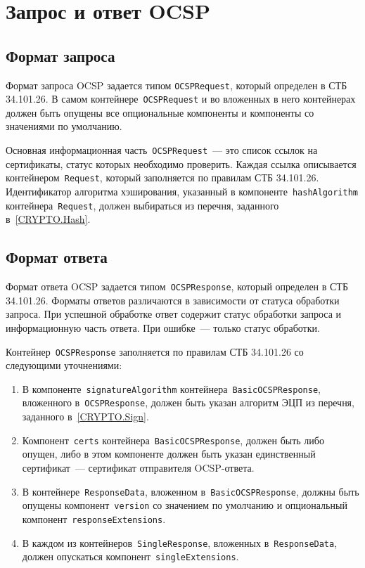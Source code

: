 \section{Запрос и ответ OCSP}\label{FMT.OCSP}

\subsection{Формат запроса}

Формат запроса OCSP задается типом \texttt{OCSPRequest}, который определен 
в СТБ 34.101.26. В самом контейнере~\texttt{OCSPRequest} и во вложенных в него
контейнерах должен быть опущены все опциональные компоненты и компоненты 
со значениями по умолчанию.

Основная информационная часть~\texttt{OCSPRequest}~--- это список ссылок
на сертификаты, статус которых необходимо проверить.
%
Каждая ссылка описывается контейнером~\texttt{Request}, который заполняется
по правилам СТБ 34.101.26. Идентификатор алгоритма хэширования, указанный в
компоненте~\texttt{hashAlgorithm} контейнера~\texttt{Request}, должен
выбираться из перечня, заданного в~\ref{CRYPTO.Hash}.

\subsection{Формат ответа}

Формат ответа OCSP задается типом~\texttt{OCSPResponse}, который определен 
в СТБ 34.101.26. Форматы ответов различаются в зависимости от статуса 
обработки запроса. При успешной обработке ответ содержит статус обработки 
запроса и информационную часть ответа. При ошибке~--- только статус обработки.

Контейнер~\texttt{OCSPResponse} заполняется по правилам СТБ 34.101.26
со следующими уточнениями:

\begin{enumerate}
\item
В компоненте~\texttt{signatureAlgorithm} 
контейнера~\texttt{BasicOCSPResponse}, вложенного   
в~\texttt{OCSPResponse}, должен быть указан алгоритм ЭЦП
из перечня, заданного в~\ref{CRYPTO.Sign}.

\item
Компонент~\texttt{certs} контейнера~\texttt{BasicOCSPResponse}, 
должен быть либо опущен, либо в этом компоненте должен быть указан 
единственный сертификат~--- сертификат отправителя OCSP-ответа.

\item
В контейнере~\texttt{ResponseData}, вложенном 
в~\texttt{BasicOCSPResponse}, должны быть опущены 
компонент~\texttt{version} со значением по умолчанию
и опциональный компонент~\texttt{responseExtensions}.

\item
В каждом из контейнеров~\texttt{SingleResponse}, вложенных
в~\texttt{ResponseData}, должен опускаться 
компонент~\texttt{singleExtensions}.
\end{enumerate}
